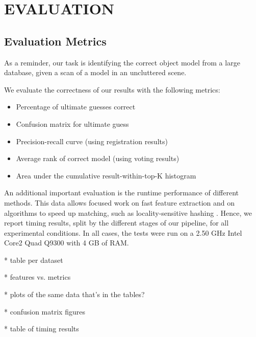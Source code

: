 \section{EVALUATION}

\subsection{Evaluation Metrics}
As a reminder, our task is identifying the correct object model from a large database, given a scan of a model in an uncluttered scene.

We evaluate the correctness of our results with the following metrics:
\begin{itemize}
  \item Percentage of ultimate guesses correct
  \item Confusion matrix for ultimate guess
  \item Precision-recall curve (using registration results)
  \item Average rank of correct model (using voting results)
  \item Area under the cumulative result-within-top-K histogram
\end{itemize}


An additional important evaluation is the runtime performance of different methods.
This data allows focused work on fast feature extraction and on algorithms to speed up matching, such as locality-sensitive hashing \cite{Frome2004}.
Hence, we report timing results, split by the different stages of our pipeline, for all experimental conditions.
In all cases, the tests were run on a 2.50 GHz Intel Core2 Quad Q9300 with 4 GB of RAM.

* table per dataset

* features vs. metrics

* plots of the same data that's in the tables?

* confusion matrix figures

* table of timing results

